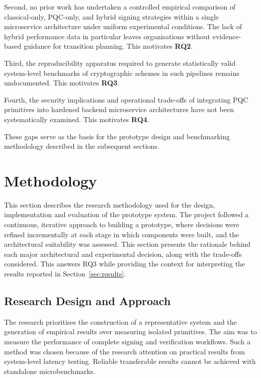 \documentclass[12pt,a4paper]{article}
\begin{document}
Second, no prior work has undertaken a controlled empirical comparison of classical-only, PQC-only, and hybrid signing strategies within a single microservice architecture under uniform experimental conditions. The lack of hybrid performance data in particular leaves organisations without evidence-based guidance for transition planning. This motivates \textbf{RQ2}.

Third, the reproducibility apparatus required to generate statistically valid system-level benchmarks of cryptographic schemes in such pipelines remains undocumented. This motivates \textbf{RQ3}.

Fourth, the security implications and operational trade-offs of integrating PQC primitives into hardened backend microservice architectures have not been systematically examined. This motivates \textbf{RQ4}.

These gaps serve as the basis for the prototype design and benchmarking methodology described in the subsequent sections.

\newpage
\section{Methodology}
\label{sec:methodology}

This section describes the research methodology used for the design, implementation and evaluation of the prototype system. The project followed a continuous, iterative approach to building a prototype, where decisions were refined incrementally at each stage in which components were built, and the architectural suitability was assessed. This section presents the rationale behind each major architectural and experimental decision, along with the trade-offs considered. This answers RQ3 while providing the context for interpreting the results reported in Section~\ref{sec:results}.

\subsection{Research Design and Approach}

The research prioritises the construction of a representative system and the generation of empirical results over measuring isolated primitives. The aim was to measure the performance of complete signing and verification workflows. Such a method was chosen because of the research attention on practical results from system-level latency testing. Reliable transferable results cannot be achieved with standalone microbenchmarks.
\end{document}
